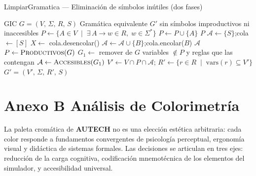 \newpage
\begin{algobox}{LimpiarGramatica — Eliminación de símbolos inútiles (dos fases)}
\begin{algorithmic}[1]
  \Require GIC $G = (V,\,\Sigma,\,R,\,S)$
  \Ensure  Gramática equivalente $G'$ sin símbolos improductivos ni inaccesibles
  \State
   
    \State $P \gets \{A \in V \;\mid\; \exists\, A\!\to\!w \in R,\; w \in \Sigma^*\}$
    \Repeat
          \State $P \gets P \cup \{A\}$
        \EndIf
      \EndFor
    \State \Return $P$
  \EndFunction
  \State
   
    \State $\mathcal{A} \gets \{S\}$;\quad cola $\gets [S]$
      \State $X \gets$ cola.desencolar()
            \State $\mathcal{A} \gets \mathcal{A} \cup \{B\}$;\quad cola.encolar($B$)
          \EndIf
        \EndFor
      \EndFor
    \EndWhile
    \State \Return $\mathcal{A}$
  \EndFunction
  \State
  \State $P \gets \Call{Productivos}{G}$
  \State $G_1 \gets$ remover de $G$ variables $\notin P$ y reglas que las contengan
  \State $\mathcal{A} \gets \Call{Accesibles}{G_1}$
  \State $V' \gets V \cap P \cap \mathcal{A}$;\quad
         $R' \gets \{r \in R \;\mid\; \mathrm{vars}(r) \subseteq V'\}$
  \State \Return $G' = (V',\,\Sigma,\,R',\,S)$
  \State {}
\end{algorithmic}
\end{algobox}

\newpage
\bigskip
\section*{Anexo B \textemdash{} Análisis de Colorimetría}

La paleta cromática de \textbf{AUTECH} no es una elección estética arbitraria: cada color responde
a fundamentos convergentes de psicología perceptual, ergonomía visual y didáctica de sistemas
formales. Las decisiones se articulan en tres ejes: reducción de la carga cognitiva, codificación
mnemotécnica de los elementos del simulador, y accesibilidad universal.

